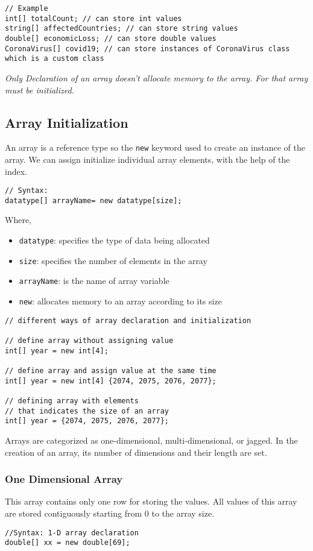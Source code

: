\begin{lstlisting}[numbers=none]
// Example
int[] totalCount; // can store int values
string[] affectedCountries; // can store string values
double[] economicLoss; // can store double values
CoronaVirus[] covid19; // can store instances of CoronaVirus class which is a custom class
\end{lstlisting}
\emph{Only Declaration of an array doesn’t allocate memory to the array. For that array must be initialized.}

\subsection{Array Initialization}
An array is a reference type so the \verb|new| keyword used to create an instance of the array. We can assign initialize individual array elements, with the help of the index.

\begin{lstlisting}[numbers=none]
// Syntax:
datatype[] arrayName= new datatype[size];
\end{lstlisting}
Where,
\begin{itemize}
	\item \texttt{datatype}: specifies the type of data being allocated
	\item \texttt{size}: specifies the number of elements in the array
	\item \texttt{arrayName}: is the name of array variable
	\item \texttt{new}: allocates memory to an array according to its size
\end{itemize}


\begin{lstlisting}[numbers=none]
 // different ways of array declaration and initialization

// define array without assigning value
int[] year = new int[4];

// define array and assign value at the same time
int[] year = new int[4] {2074, 2075, 2076, 2077};

// defining array with elements
// that indicates the size of an array
int[] year = {2074, 2075, 2076, 2077};
\end{lstlisting}


\noindent Arrays are categorized as one-dimensional, multi-dimensional, or jagged. In the creation of an array, its number of dimensions and their length are set.

\subsubsection*{One Dimensional Array}
This array contains only one row for storing the values. All values of this array are stored contiguously starting from 0 to the array size.
\begin{lstlisting}[numbers=none]
//Syntax: 1-D array declaration
double[] xx = new double[69];
\end{lstlisting}


